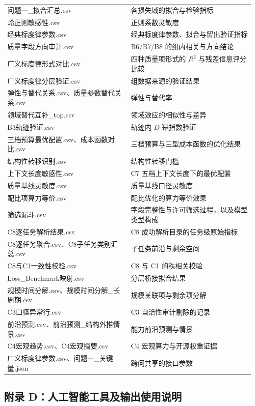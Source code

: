 \begin{longtable}{@{}>{\raggedright\arraybackslash}p{}>{\raggedright\arraybackslash}p{}@{}}
  问题一\_\allowbreak{}拟合汇总.csv & 各损失域的拟合与检验指标 \\
  岭正则敏感性.csv & 正则系数灵敏度 \\
  经典标度律参数.csv & 经典标度律参数、拟合与留出验证指标 \\
  质量字段方向审计.csv & B6/B7/B8 的组内相关与方向结论 \\
  广义标度律形式对比.csv & 四种质量项形式的 $R^2$ 与残差信息评分 比较 \\
  广义标度律分层验证.csv & 6 组数据来源的验证结果 \\
  弹性与替代关系.csv、质量参数替代关系.csv & 弹性与替代率 \\
  领域替代互补\_\allowbreak{}top.csv & 领域效应的相似性与差异 \\
  B3轨迹验证.csv & 轨迹内 $D$ 幂指数验证 \\
  三档预算最优配置.csv、成本函数对比.csv & 三档预算与三型成本函数的优化结果 \\
  结构性转移识别.csv & 结构性转移门槛 \\
  上下文长度敏感性.csv & C7 五档上下文长度下的最优配置 \\
  质量基线灵敏度.csv & 质量基线口径灵敏度 \\
  配比项算力等价.csv & 配比优化的算力等价效果 \\
  筛选漏斗.csv & 字段完整性与许可筛选过程，以及模型类型构成 \\
  C8逐任务解析结果.csv & C8 成功解析目录的任务级原始指标 \\
  C8逐任务聚合.csv、C8子任务类别汇总.csv & 子任务前沿与剩余空间 \\
  C8与C1一致性校验.csv & C8 与 C1 的秩相关校验 \\
  Loss\_\allowbreak{}Benchmark映射.csv & 分层桥接拟合结果 \\
  规模时间分解.csv、规模时间分解\_\allowbreak{}长周期.csv & 规模关联项与剩余项分解 \\
  C3口径异常行.csv & C3 自洽性审计剔除的记录 \\
  前沿预测.csv、前沿预测\_\allowbreak{}结构外推情景.csv & 能力前沿预测与情景 \\
  C4宏观趋势.csv、C4宏观摘要.csv & C4 宏观算力与开源权重证据 \\
  广义标度律参数.csv、问题一\_\allowbreak{}关键量.json & 跨问共享的接口参数 \\
\end{longtable}

\subsection*{附录 D：人工智能工具及输出使用说明}

